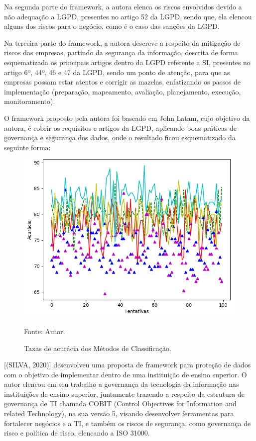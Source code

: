 \documentclass[
	12pt,				%
	openright,			%
	oneside,			%
	a4paper,			%
	english,			%
	french,				%
	spanish,			%
	brazil,				%
	]{abntex2}
\begin{document}
Na segunda parte do framework, a autora elenca os riscos envolvidos devido a não adequação a LGPD, presentes no artigo 52 da LGPD, sendo que, ela elencou alguns dos riscos para o negócio, como é o caso das sanções da LGPD.

Na terceira parte do framework, a autora descreve a respeito da mitigação de riscos das empresas, partindo da segurança da informação, descrita de forma esquematizada os principais artigos dentro da LGPD referente a SI, presentes no artigo 6º, 44º, 46 e 47 da LGPD, sendo um ponto de atenção, para que as empresas possam estar atentos e corrigir as mazelas, enfatizando os passos de implementação (preparação, mapeamento, avaliação, planejamento, execução, monitoramento).

O framework proposto pela autora foi baseado em John Latam, cujo objetivo da autora, é cobrir os requisitos e artigos da LGPD, aplicando boas práticas de governança e segurança dos dados, onde o resultado ficou esquematizado da seguinte forma:

\begin{figure}[ht]
    \centering
    \caption{Taxas de acurácia dos Métodos de Classificação.}
    \includegraphics[width=5.0in]{Images/acc-classification.png}
    \label{fig: grafico-acc}
    
    \centering \small Fonte: Autor.
\end{figure}

[(SILVA, 2020)] desenvolveu uma proposta de framework para proteção de dados com o objetivo de implementar dentro de uma instituição de ensino superior. O autor elencou em seu trabalho a governança da tecnologia da informação nas instituições de ensino superior, juntamente trazendo a respeito da estrutura de governança de TI chamada COBIT (Control Objectives for Information and related Technology), na sua versão 5, visando desenvolver ferramentas para fortalecer negócios e a TI, e também os riscos de segurança, como governança de risco e política de risco, elencando a ISO 31000.
\end{document}
